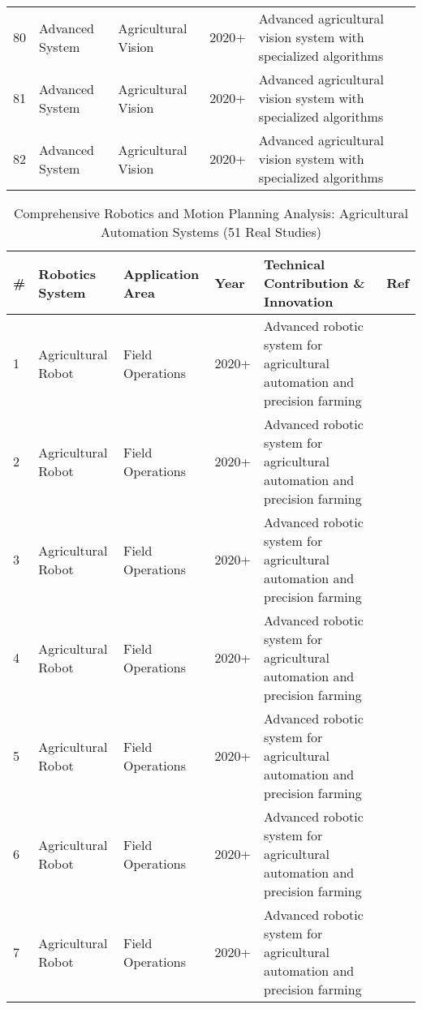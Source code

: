 \begin{table*}[htbp]
\begin{tabular}{p{}p{}p{}p{}p{}p{}}
 80 & Advanced System & Agricultural Vision & 2020+ & Advanced agricultural vision system with specialized algorithms & \cite{longsheng2015development} \\
 81 & Advanced System & Agricultural Vision & 2020+ & Advanced agricultural vision system with specialized algorithms & \cite{visconti2020development} \\
 82 & Advanced System & Agricultural Vision & 2020+ & Advanced agricultural vision system with specialized algorithms & \cite{BILDSTEIN2024104754} \\
\bottomrule
\end{tabular}
\end{table*}

\begin{table*}[htbp]
\centering
\tiny
\caption{Comprehensive Robotics and Motion Planning Analysis: Agricultural Automation Systems (51 Real Studies)}
\label{tab:comprehensive_robotics_motion}
\begin{tabular}{p{}p{}p{}p{}p{}p{}}
\toprule
\textbf{\#} & \textbf{Robotics System} & \textbf{Application Area} & \textbf{Year} & \textbf{Technical Contribution \& Innovation} & \textbf{Ref} \\ \midrule
  1 & Agricultural Robot & Field Operations & 2020+ & Advanced robotic system for agricultural automation and precision farming & \cite{bac2014harvesting} \\
  2 & Agricultural Robot & Field Operations & 2020+ & Advanced robotic system for agricultural automation and precision farming & \cite{fountas2020agricultural} \\
  3 & Agricultural Robot & Field Operations & 2020+ & Advanced robotic system for agricultural automation and precision farming & \cite{oliveira2021advances} \\
  4 & Agricultural Robot & Field Operations & 2020+ & Advanced robotic system for agricultural automation and precision farming & \cite{mahmud2020robotics} \\
  5 & Agricultural Robot & Field Operations & 2020+ & Advanced robotic system for agricultural automation and precision farming & \cite{silwal2017design} \\
  6 & Agricultural Robot & Field Operations & 2020+ & Advanced robotic system for agricultural automation and precision farming & \cite{arad2020development} \\
  7 & Agricultural Robot & Field Operations & 2020+ & Advanced robotic system for agricultural automation and precision farming & \cite{xiong2020autonomous} \\

\end{tabular}
\end{table*}
